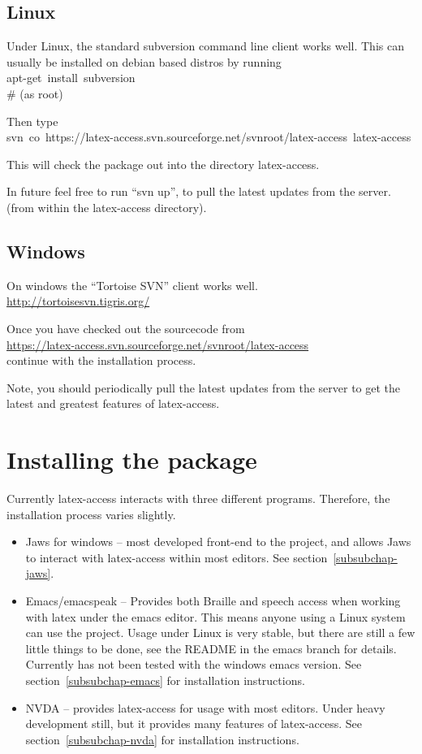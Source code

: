 \documentclass[12pt,a4paper]{report}
\begin{document}
\subsection{Linux}
\label{subsubchap-linux}

Under Linux, the standard subversion command line client works
well. This can usually be installed on debian based distros by running\\
\mbox{apt-get install subversion}\\
\# (as root)

Then type\\
\mbox{svn co https://latex-access.svn.sourceforge.net/svnroot/latex-access latex-access}

This will check the package out into the directory latex-access.

In future feel free to run ``svn up'', to pull the latest updates from
the server. (from within the latex-access directory).

\subsection{Windows}
\label{subsubchap-windows}

On windows the ``Tortoise SVN'' client works well.\\
\url{http://tortoisesvn.tigris.org/}

Once you have checked out the sourcecode from\\
\url{https://latex-access.svn.sourceforge.net/svnroot/latex-access}\\
continue with the installation
process.

Note, you should periodically pull the latest updates from the server to
get the latest and greatest features of latex-access.

\section{Installing the package}

Currently latex-access interacts with three different
programs. Therefore, the installation process varies slightly.

\begin{itemize}
\item Jaws for windows -- most developed front-end to the project, and
  allows Jaws to interact with latex-access within most editors. See
  section~\ref{subsubchap-jaws}.
\item Emacs/emacspeak -- Provides both Braille and speech access when
    working with latex under the emacs editor. This means anyone using a
    Linux system can use the project. Usage under Linux is very stable,
    but there are still a few little things to be done, see the README
    in the emacs branch for details. Currently has not been tested with
    the windows emacs version. See section~\ref{subsubchap-emacs} for
    installation instructions.
\item NVDA -- provides latex-access for usage with most
      editors. Under heavy development still, but it provides many
      features of latex-access. See section~\ref{subsubchap-nvda} for
      installation instructions.
\end{itemize}
\end{document}
